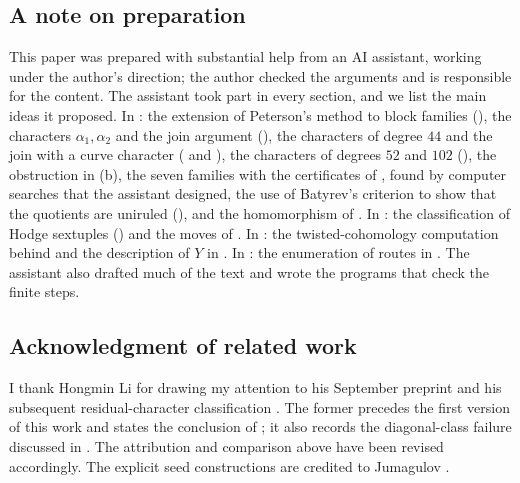 \subsection*{A note on preparation}
This paper was prepared with substantial help from an AI assistant, working
under the author's direction; the author checked the arguments and is
responsible for the content. The assistant took part in every section, and
we list the main ideas it proposed. In : the extension
of Peterson's method to block families (), the
characters $\alpha_{1},\alpha_{2}$ and the join argument
(), the characters of degree $44$ and the join
with a curve character ( and ), the
characters of degrees $52$ and $102$ (), the
obstruction in (b), the seven families with the
certificates of , found by computer searches that the
assistant designed, the use of Batyrev's criterion to show that the
quotients are uniruled (), and the homomorphism of
. In : the classification of Hodge sextuples
() and the moves of . In
: the twisted-cohomology computation behind
 and the description of $Y$ in . In
: the enumeration of routes in . The
assistant also drafted much of the text and wrote the programs that check
the finite steps.

\subsection*{Acknowledgment of related work}
I thank Hongmin Li for drawing my attention to his September preprint
\cite{Li26a} and his subsequent residual-character classification
\cite{Li26b}. The former precedes the first version of this work and
states the conclusion of ; it also records the
diagonal-class failure discussed in . The attribution and
comparison above have been revised accordingly. The explicit seed
constructions are credited to Jumagulov \cite{Jum26}.
